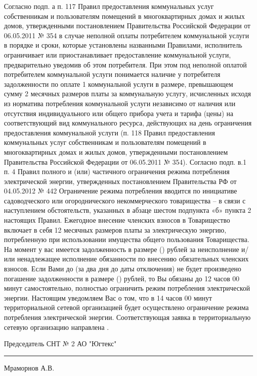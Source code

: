 Согласно подп. а п. 117 Правил предоставления коммунальных услуг собственникам и пользователям помещений в многоквартирных домах и жилых домов, утвержденными постановлением Правительства Российской Федерации от 06.05.2011 № 354 в случае неполной оплаты потребителем коммунальной услуги в порядке и сроки, которые установлены названными Правилами, исполнитель ограничивает или приостанавливает предоставление коммунальной услуги, предварительно уведомив об этом потребителя.
При этом под неполной оплатой потребителем коммунальной услуги понимается наличие у потребителя задолженности по оплате 1 коммунальной услуги в размере, превышающем сумму 2 месячных размеров платы за коммунальную услугу, исчисленных исходя из норматива потребления коммунальной услуги независимо от наличия или отсутствия индивидуального или общего прибора учета и тарифа (цены) на соответствующий вид коммунального ресурса, действующих на день ограничения предоставления коммунальной услуги (п. 118 Правил предоставления коммунальных услуг собственникам и пользователям помещений в многоквартирных домах и жилых домов, утвержденными постановлением Правительства Российской Федерации от 06.05.2011 № 354).
Согласно подп. в.1 п. 4 Правил полного и (или) частичного ограничения режима потребления электрической энергии, утвержденных постановлением Правительства РФ от 04.05.2012 № 442 Ограничение режима потребления вводится по инициативе садоводческого или огороднического некоммерческого товарищества – в связи с наступлением обстоятельств, указанных в абзаце шестом подпункта «б» пункта 2 настоящих Правил.
Ежегодное внесение членских взносов в Товарищество включает в себя 12 месячных размеров платы за электрическую энергию, потребленную при использовании имущества общего пользования Товарищества. 
На момент         у вас имеется задолженность в размере    ()           рублей за неисполнение и/или ненадлежащее исполнение обязанности по внесению  обязательных членских взносов. 
Если Вами до  (за два дня до даты отключения) не будет произведено погашение задолженности в размере  ()            рублей, то Вы обязаны до 12 часов 00 минут   самостоятельно, полностью ограничить режим потребления электрической энергии. 
Настоящим уведомляем Вас о том, что в 14 часов 00 минут     территориальной сетевой организацией будет осуществлено ограничение режима потребления электрической энергии. 
Соответствующая заявка в территориальную сетевую организацию направлена  .

\vspace{5mm}



\vspace{15mm}
\noindent Председатель СНТ № 2 АО "Югтекс" \hfill    \rule{3cm}{0.1 mm}    Мраморнов А.В.